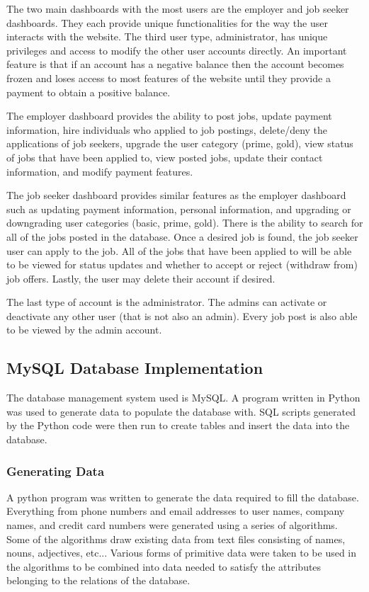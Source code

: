\documentclass[11pt]{article}
\begin{document}
The two main dashboards with the most users are the employer and job seeker dashboards. They each provide unique functionalities for the way the user interacts with the website. The third user type, administrator, has unique privileges and access to modify the other user accounts directly. An important feature is that if an account has a negative balance then the account becomes frozen and loses access to most features of the website until they provide a payment to obtain a positive balance. \par
The employer dashboard provides the ability to post jobs, update payment information, hire individuals who applied to job postings, delete/deny the applications of job seekers, upgrade the user category (prime, gold), view status of jobs that have been applied to, view posted jobs, update their contact information, and modify payment features. \par 
The job seeker dashboard provides similar features as the employer dashboard such as updating payment information, personal information, and upgrading or downgrading user categories (basic, prime, gold). There is the ability to search for all of the jobs posted in the database. Once a desired job is found, the job seeker user can apply to the job. All of the jobs that have been applied to will be able to be viewed for status updates and whether to accept or reject (withdraw from) job offers. Lastly, the user may delete their account if desired. \par
The last type of account is the administrator. The admins can activate or deactivate any other user (that is not also an admin).  Every job post is also able to be viewed by the admin account.

\subsection{MySQL Database Implementation}

The database management system used is MySQL. A program written in Python was used to generate data to populate the database with. SQL scripts generated by the Python code were then run to create tables and insert the data into the database.

\subsubsection{Generating Data}

A python program was written to generate the data required to fill the database. Everything from phone numbers and email addresses to user names, company names, and credit card numbers were generated using a series of algorithms. Some of the algorithms draw existing data from text files consisting of names, nouns, adjectives, etc... Various forms of primitive data were taken to be used in the algorithms to be combined into data needed to satisfy the attributes belonging to the relations of the database.
\end{document}

